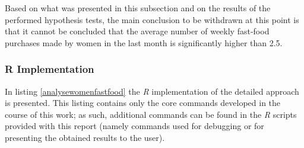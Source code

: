 \documentclass[12pt]{article}
\begin{document}
Based on what was presented in this subsection and on the results of the performed hypothesis tests, the main conclusion to be withdrawn at this point is that it cannot be concluded that the average number of weekly fast-food purchases made by women in the last month is significantly higher than 2.5.

\subsubsection{R Implementation}

In listing \ref{analysewomenfastfood} the \emph{R} implementation of the detailed approach is presented. This listing contains only the core commands developed in the course of this work; as such, additional commands can be found in the \emph{R} scripts provided with this report (namely commands used for debugging or for presenting the obtained results to the user).
\end{document}
